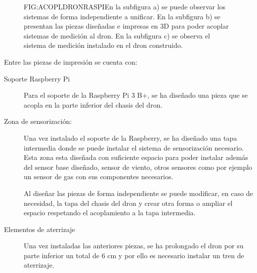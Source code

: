 \begin{figure}[Antes y después de adapatacion raspberry-dron]{FIG:ACOPLDRONRASPI}{En la subfigura a) se puede observar los sistemas de forma independiente a unificar. En la subfigura b) se presentan las piezas diseñadas e impresas en 3D para poder acoplar sistemas de medición al dron. En la subfigura c) se observa el sistema de medición instalado en el dron construido.}
\end{figure}

Entre las piezas de impresión se cuenta con:
\begin{description}
\item[Soporte Raspberry Pi]
Para el soporte de la Raspberry Pi 3 B+, se ha diseñado una pieza que se acopla en la parte inferior del chasis del dron. 


\item[Zona de sensorización: ]

Una vez instalado el soporte de la Raspberry, se ha diseñado una tapa intermedia donde se puede instalar el sistema de sensorización necesario. 
Esta zona esta diseñada con suficiente espacio para poder instalar además del sensor base diseñado, sensor de viento, otros sensores como por ejemplo un sensor de gas con sus componentes necesarios.

%	
%  

Al diseñar las piezas de forma independiente se puede modificar, en caso de necesidad, la tapa del chasis del dron y crear otra forma o ampliar el espacio respetando el acoplamiento a la tapa intermedia.

\item[Elementos de aterrizaje]

Una vez instaladas las anteriores piezas, se ha prolongado el dron por su parte inferior un total de 6 cm y por ello es necesario instalar un tren de aterrizaje.

\end{description}

